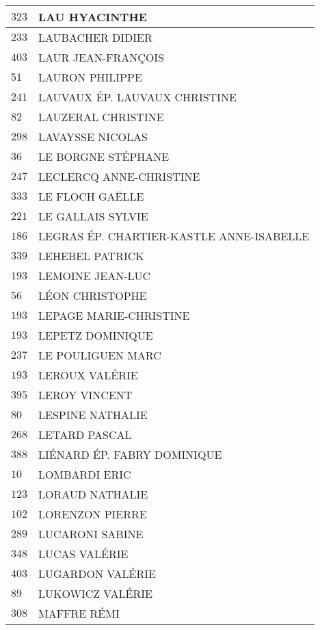 \begin{xltabular}{\linewidth}{|l|X|}
    \hline
    $323$ & LAU HYACINTHE \\
    \hline
    $233$ & LAUBACHER DIDIER \\
    \hline
    $403$ & LAUR JEAN-FRANÇOIS \\
    \hline
    $51$ & LAURON PHILIPPE \\
    \hline
    $241$ & LAUVAUX ÉP. LAUVAUX CHRISTINE \\
    \hline
    $82$ & LAUZERAL CHRISTINE \\
    \hline
    $298$ & LAVAYSSE NICOLAS \\
    \hline
    $36$ & LE BORGNE STÉPHANE \\
    \hline
    $247$ & LECLERCQ ANNE-CHRISTINE \\
    \hline
    $333$ & LE FLOCH GAËLLE \\
    \hline
    $221$ & LE GALLAIS SYLVIE \\
    \hline
    $186$ & LEGRAS ÉP. CHARTIER-KASTLE ANNE-ISABELLE \\
    \hline
    $339$ & LEHEBEL PATRICK \\
    \hline
    $193$ & LEMOINE JEAN-LUC \\
    \hline
    $56$ & LÉON CHRISTOPHE \\
    \hline
    $193$ & LEPAGE MARIE-CHRISTINE \\
    \hline
    $193$ & LEPETZ DOMINIQUE \\
    \hline
    $237$ & LE POULIGUEN MARC \\
    \hline
    $193$ & LEROUX VALÉRIE \\
    \hline
    $395$ & LEROY VINCENT \\
    \hline
    $80$ & LESPINE NATHALIE \\
    \hline
    $268$ & LETARD PASCAL \\
    \hline
    $388$ & LIÉNARD ÉP. FABRY DOMINIQUE \\
    \hline
    $10$ & LOMBARDI ERIC \\
    \hline
    $123$ & LORAUD NATHALIE \\
    \hline
    $102$ & LORENZON PIERRE \\
    \hline
    $289$ & LUCARONI SABINE \\
    \hline
    $348$ & LUCAS VALÉRIE \\
    \hline
    $403$ & LUGARDON VALÉRIE \\
    \hline
    $89$ & LUKOWICZ VALÉRIE \\
    \hline
    $308$ & MAFFRE RÉMI \\

\end{xltabular}
